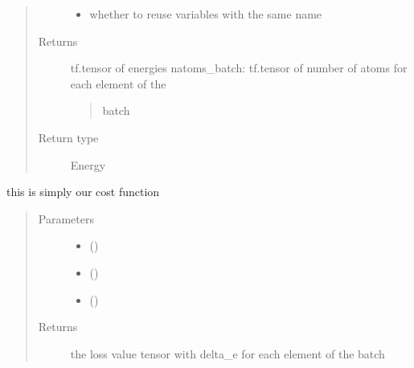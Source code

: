 \documentclass[letterpaper,10pt,english]{sphinxmanual}
\begin{document}
\begin{fulllineitems}
\begin{quote}
\begin{description}
\begin{itemize}
\item {} 
 \textendash{} whether to reuse variables with the same name

\end{itemize}

\item[{Returns}] \leavevmode

tf.tensor of energies
natoms\_batch: tf.tensor of number of atoms for each element of the
\begin{quote}

batch
\end{quote}


\item[{Return type}] \leavevmode
Energy

\end{description}\end{quote}

\end{fulllineitems}


\begin{fulllineitems}
\label{\detokenize{neuralnet/networks:networks.loss_NN}}
this is simply our cost function
\begin{quote}\begin{description}
\item[{Parameters}] \leavevmode\begin{itemize}
\item {} 
 () \textendash{} 

\item {} 
 () \textendash{} 

\item {} 
 () \textendash{} 

\end{itemize}

\item[{Returns}] \leavevmode
the loss value
tensor with delta\_e for each element of the batch

\end{description}\end{quote}

\end{fulllineitems}
\end{document}
